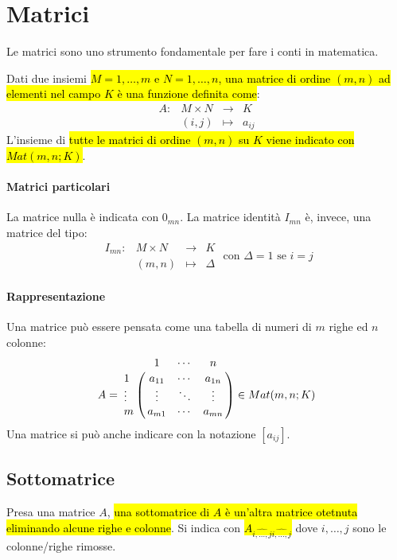 \section{Matrici}
Le matrici sono uno strumento fondamentale per fare i conti in matematica.

Dati due insiemi \hl{$M = {1, \ldots, m}$ e $N = {1, \ldots, n}$, una matrice di
ordine $(m, n)$ ad elementi nel campo $K$ è una funzione definita come}:
\[
    \begin{array}{cccc}
        A: &M \times N &\to &K \\
        &(i,j) &\mapsto &a_{ij}
    \end{array}
\]
L'insieme di \hl{tutte le matrici di ordine $(m,n)$ su $K$ viene indicato con
$Mat(m,n;K)$}.

\paragraph{Matrici particolari} La matrice nulla è indicata con $0_{mn}$. La
matrice identità $I_{mn}$ è, invece, una matrice del tipo:
\[
    \begin{array}{cccc}
        I_{mn}: & M \times N & \to & K \\
        & (m,n) & \mapsto & \Delta
    \end{array} \text{ con } \Delta{} = 1 \text{ se } i = j
\]

\paragraph{Rappresentazione} Una matrice può essere pensata come una tabella di
numeri di $m$ righe ed $n$ colonne:
\[
    A =
    \bordermatrix{~ & 1 & \cdots & n \cr
                  1 & a_{11} & \cdots & a_{1n} \cr
                  \vdots & \vdots & \ddots & \vdots \cr
                  m & a_{m1} & \cdots & a_{mn} \cr }
    \in Mat(m,n;K)
\]
Una matrice si può anche indicare con la notazione $[a_{ij}]$.

\subsection{Sottomatrice}
Presa una matrice $A$, \hl{una sottomatrice di $A$ è un'altra matrice otetnuta
eliminando alcune righe e colonne}. Si indica con 
\hl{$A_{\widehat{i,\dotsc,j}\widehat{i,\dotsc,j}}$} dove $i,\dotsc,j$ sono le 
colonne/righe rimosse.

